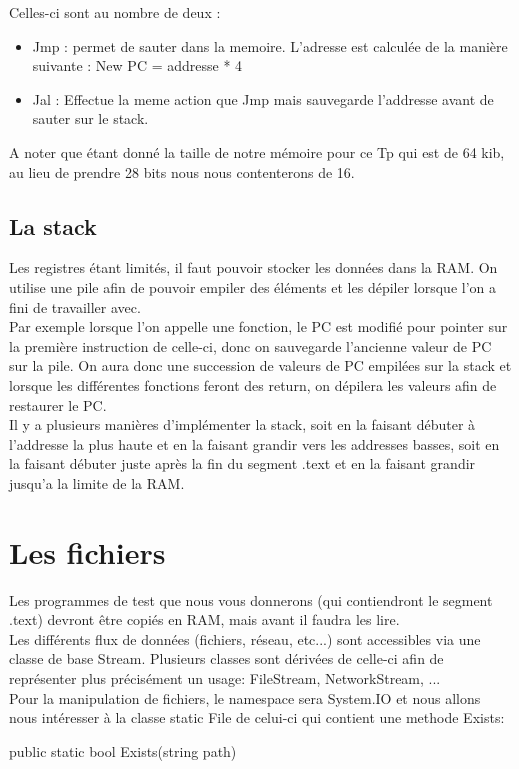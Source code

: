 Celles-ci sont au nombre de deux :
\begin{itemize}
\item Jmp : permet de sauter dans la memoire. L'adresse est calculée de la manière suivante : New PC = addresse * 4
\item Jal : Effectue la meme action que Jmp mais sauvegarde l'addresse avant de sauter sur le stack.
\end{itemize}

A noter que étant donné la taille de notre mémoire pour ce Tp qui est de 64 kib, au lieu de prendre 28 bits nous nous contenterons de 16.


\subsection{La stack}
Les registres étant limités, il faut pouvoir stocker les données dans la RAM. On utilise une pile afin de pouvoir empiler des éléments et les dépiler lorsque l'on a fini de travailler avec.\\
Par exemple lorsque l'on appelle une fonction, le PC est modifié pour pointer sur la première instruction de celle-ci, donc on sauvegarde l'ancienne valeur de PC sur la pile. On aura donc une succession de valeurs de PC empilées sur la stack et lorsque les différentes fonctions feront des return, on dépilera les valeurs afin de restaurer le PC.\\ Il y a plusieurs manières d'implémenter la stack, soit en la faisant débuter à l'addresse la plus haute et en la faisant grandir vers les addresses basses, soit en la faisant débuter juste après la fin du segment .text et en la faisant grandir jusqu'a la limite de la RAM.

\section {Les fichiers}
Les programmes de test que nous vous donnerons (qui contiendront le segment .text) devront être copiés en RAM, mais avant il faudra les lire.\\
Les différents flux de données (fichiers, réseau, etc...) sont accessibles via une classe de base Stream. Plusieurs classes sont dérivées de celle-ci afin de représenter plus précisément un usage: FileStream, NetworkStream, ...\\
Pour la manipulation de fichiers, le namespace sera System.IO et nous allons nous intéresser à la classe static File de celui-ci qui contient une methode Exists:
\begin{code}
public static bool Exists(string path)
\end{code}

